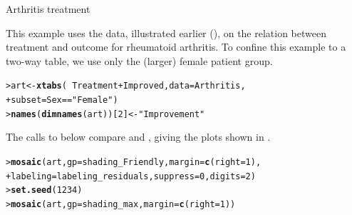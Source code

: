 \documentclass[10pt,krantz2]{krantz}\usepackage[]{graphicx}\usepackage[]{color}
\makeatletter
\newcommand{\hlnum}[1]{\textcolor[rgb]{0.686,0.059,0.569}{#1}}%
\newcommand{\hlstr}[1]{\textcolor[rgb]{0.192,0.494,0.8}{#1}}%
\newcommand{\hlopt}[1]{\textcolor[rgb]{0,0,0}{#1}}%
\newcommand{\hlstd}[1]{\textcolor[rgb]{0.345,0.345,0.345}{#1}}%
\newcommand{\hlkwb}[1]{\textcolor[rgb]{0.69,0.353,0.396}{#1}}%
\newcommand{\hlkwc}[1]{\textcolor[rgb]{0.333,0.667,0.333}{#1}}%
\newcommand{\hlkwd}[1]{\textcolor[rgb]{0.737,0.353,0.396}{\textbf{#1}}}%
\newenvironment{kframe}{%
 \def\at@end@of@kframe{}%
 \ifinner\ifhmode%
  \def\at@end@of@kframe{\end{minipage}}%
  \begin{minipage}{\columnwidth}%
 \fi\fi%
 \def\FrameCommand##1{\hskip\@totalleftmargin \hskip-\fboxsep
 \colorbox{shadecolor}{##1}\hskip-\fboxsep
     \hskip-\linewidth \hskip-\@totalleftmargin \hskip\columnwidth}%
 \MakeFramed {\advance\hsize-\width
   \@totalleftmargin\z@ \linewidth\hsize
   \@setminipage}}%
 {\par\unskip\endMakeFramed%
 \at@end@of@kframe}
\newenvironment{knitrout}{}{} %
\renewenvironment{knitrout}{\small\renewcommand{\baselinestretch}{.85}}{} %
\makeatother
\begin{document}
\begin{Example}{Arthritis treatment}

This example uses the  data, illustrated earlier (),
on the relation between treatment and outcome for rheumatoid arthritis.
To confine this example to a two-way table, we use only the (larger) female
patient group.
\begin{knitrout}
\color{fgcolor}\begin{kframe}
\begin{alltt}
\hlstd{> }\hlstd{art} \hlkwb{<-} \hlkwd{xtabs}\hlstd{(}\hlopt{~} \hlstd{Treatment} \hlopt{+} \hlstd{Improved,} \hlkwc{data} \hlstd{= Arthritis,}
\hlstd{+ }             \hlkwc{subset} \hlstd{= Sex} \hlopt{==} \hlstr{"Female"}\hlstd{)}
\hlstd{> }\hlkwd{names}\hlstd{(}\hlkwd{dimnames}\hlstd{(art))[}\hlnum{2}\hlstd{]} \hlkwb{<-} \hlstr{"Improvement"}
\end{alltt}
\end{kframe}
\end{knitrout}
The calls to  below compare  and ,
giving the plots shown in .

\begin{knitrout}
\color{fgcolor}\begin{kframe}
\begin{alltt}
\hlstd{> }\hlkwd{mosaic}\hlstd{(art,} \hlkwc{gp} \hlstd{= shading_Friendly,} \hlkwc{margin} \hlstd{=} \hlkwd{c}\hlstd{(}\hlkwc{right} \hlstd{=} \hlnum{1}\hlstd{),}
\hlstd{+ }       \hlkwc{labeling} \hlstd{= labeling_residuals,} \hlkwc{suppress} \hlstd{=} \hlnum{0}\hlstd{,} \hlkwc{digits} \hlstd{=} \hlnum{2}\hlstd{)}
\hlstd{> }\hlkwd{set.seed}\hlstd{(}\hlnum{1234}\hlstd{)}
\hlstd{> }\hlkwd{mosaic}\hlstd{(art,} \hlkwc{gp} \hlstd{= shading_max,} \hlkwc{margin} \hlstd{=} \hlkwd{c}\hlstd{(}\hlkwc{right} \hlstd{=} \hlnum{1}\hlstd{))}
\end{alltt}
\end{kframe}\begin{figure}[!htbp]


\end{figure}
\end{knitrout}
\end{Example}
\end{document}
